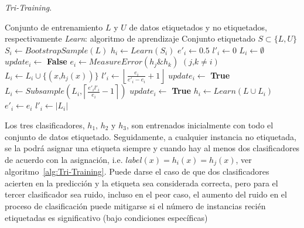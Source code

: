 \begin{algorithm}
\caption{\textit{Tri-Training}.}\label{alg:Tri-Training}
\begin{algorithmic}[1]
\Require Conjunto de entrenamiento $L$ y $U$ de datos etiquetados y no etiquetados, respectivamente
\Require \textit{Learn}: algoritmo de aprendizaje
\Ensure Conjunto etiquetado $S \subset \lbrace L,U \rbrace$
\Statex
{}
		\State $S_i \leftarrow BootstrapSample(L)$
		\State $h_i \leftarrow Learn(S_i)$
		\State $e'_i \leftarrow 0.5$
		\State $l'_i \leftarrow 0$
	\EndFor
	\Repeat
			\State $L_i \leftarrow \emptyset$
			\State $update_i \leftarrow$ \textbf{False}
			\State $e_i \leftarrow MeasureError\left(h_j \& h_k \right)$ $\left(j\text{,}k \not= i \right)$
						\State $L_i \leftarrow L_i \cup \lbrace \left( x\text{,} h_j\left(x\right)\right)\rbrace$
					\EndIf
				\EndFor
					\State $l'_i \leftarrow \left\lfloor \frac{e_i}{e'_i-e_i} + 1 \right\rfloor$
				\EndIf
					\State $update_i \leftarrow$ \textbf{True}
					\State $L_i \leftarrow Subsample\left( L_i\text{,} \left\lceil \frac{e'_il'_i}{e_i} - 1 \right\rceil \right)$
					\State $update_i \leftarrow$ \textbf{True}
				\EndIf
			\EndIf
		\EndFor
				\State $h_i \leftarrow Learn\left( L \cup L_i\right)$
				\State $e'_i \leftarrow e_i$
				\State $l'_i \leftarrow \left|L_i\right|$
			\EndIf
		\EndFor
\EndProcedure
\end{algorithmic}
\end{algorithm}

Los tres clasificadores, $h_1\text{, } h_2 \text{ y } h_3$, son entrenados inicialmente con todo el conjunto de datos etiquetado. Seguidamente, a cualquier instancia no etiquetada, se la podrá asignar una etiqueta siempre y cuando hay al menos dos clasificadores de acuerdo con la asignación, i.e. $label(x) = h_i(x) =  h_j(x)$, ver~ algoritmo~\ref{alg:Tri-Training}. Puede darse el caso de que dos clasificadores acierten en la predicción y la etiqueta sea considerada correcta, pero para el tercer clasificador sea ruido, incluso en el peor caso, el aumento del ruido en el proceso de clasificación puede mitigarse si el número de instancias recién etiquetadas es significativo (bajo condiciones específicas)~\cite{zhou2005tri}

